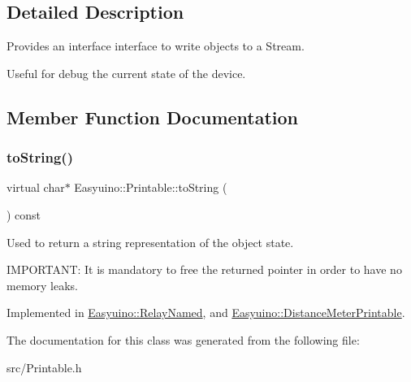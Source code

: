 \subsection{Detailed Description}
Provides an interface interface to write objects to a Stream. 

Useful for debug the current state of the device. 

\subsection{Member Function Documentation}
\mbox{\label{class_easyuino_1_1_printable_a49ae1c60dc0404600ee122c6c2684155}} 
\subsubsection{\texorpdfstring{to\+String()}{toString()}}
{\footnotesize\ttfamily virtual char$\ast$ Easyuino\+::\+Printable\+::to\+String (\begin{DoxyParamCaption}{ }\end{DoxyParamCaption}) const\hspace{0.3cm}{\ttfamily [pure virtual]}}



Used to return a string representation of the object state. 

I\+M\+P\+O\+R\+T\+A\+NT\+: It is mandatory to free the returned pointer in order to have no memory leaks. 

Implemented in \hyperlink{class_easyuino_1_1_relay_named_a1e9e82e563baaba5055ee9335551a306}{Easyuino\+::\+Relay\+Named}, and \hyperlink{class_easyuino_1_1_distance_meter_printable_a42bb42319353c84294975ed5edc3a84c}{Easyuino\+::\+Distance\+Meter\+Printable}.



The documentation for this class was generated from the following file\+:\begin{DoxyCompactItemize}
\item 
src/Printable.\+h\end{DoxyCompactItemize}
